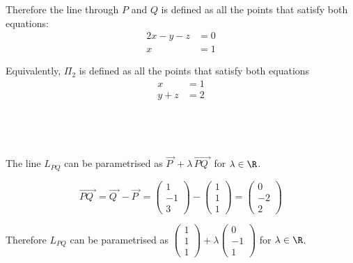 \documentclass[a4paper]{article}
\begin{document}
Therefore the line through $P$ and $Q$ is defined as all the points that satisfy both equations: \begin{align*} 2x - y - z &= 0\\
x &= 1
\end{align*}

Equivalently, $\Pi_2$ is defined as all the points that satisfy both equations \begin{align*}
x &= 1\\
y + z &= 2
\end{align*}

\subsection{~}

The line $L_{PQ}$ can be parametrised as $\overrightarrow{P\;} + \lambda\, \overrightarrow{PQ\;}$ for $\lambda \in \R$.

$$\overrightarrow{PQ\;} = \overrightarrow{Q\;} - \overrightarrow{P\;} = \begin{pmatrix}1\\ -1\\ 3\end{pmatrix} - \begin{pmatrix}1\\ 1\\ 1\end{pmatrix} = \begin{pmatrix}0\\ -2\\ 2\end{pmatrix}$$

Therefore $L_{PQ}$ can be parametrised as $\begin{pmatrix}1\\ 1\\ 1\end{pmatrix} + \lambda \begin{pmatrix}0\\ -1\\ 1\end{pmatrix}$ for $\lambda \in \R$.
\end{document}
